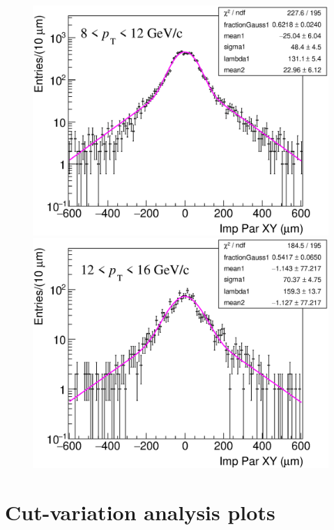 \documentclass[b5paper,10pt,twoside,oldstyle,classica]{toptesi}
\begin{document}
\begin{figure}[h]
\begin{center}
\hspace{0cm}
{\includegraphics[scale = 0.24]{ImpParBkg_8-12.eps}}
\vspace{0cm}
{\includegraphics[scale = 0.24]{ImpParBkg_12-16.eps}}
\end{center}
\end{figure}
\clearpage
\section{Cut-variation analysis plots}
\end{document}
